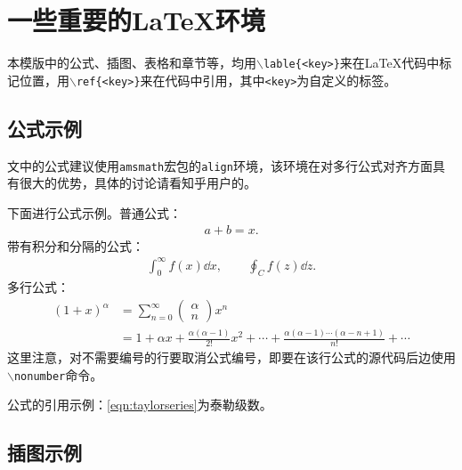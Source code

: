 \chapter{一些重要的\LaTeX{}环境}\label{chap:evm}

本模版中的公式、插图、表格和章节等，均用\texttt{$\backslash$lable\{<key>\}}来在\LaTeX{}代码中标记位置，用\texttt{$\backslash$ref\{<key>\}}来在代码中引用，其中\texttt{<key>}为自定义的标签。

\section{公式示例}

文中的公式建议使用\texttt{amsmath}宏包的\texttt{align}环境，该环境在对多行公式对齐方面具有很大的优势，具体的讨论请看知乎用户\href{https://www.zhihu.com/people/bo-xue-duo-wen-63}{}的\href{https://www.zhihu.com/question/477805692/answer/2045084752}{}。

下面进行公式示例。普通公式：
\begin{align}
    a+b=x.
\end{align}
带有积分和分隔的公式：
\begin{align}
   \int^{\infty}_{0} f(x)\dd{x}, \qquad \oint_{C} f(z)\dd {z}.
\end{align}
多行公式：
\begin{align}
    \left(1+x\right)^{\alpha} &= \sum^{\infty}_{n=0}\left(\begin{matrix} \alpha \\ n\end{matrix}\right)x^n \nonumber \\ 
    &= 1 + \alpha x + \frac{\alpha(\alpha-1)}{2!}x^2 + \cdots + \frac{\alpha(\alpha-1)\cdots(\alpha-n+1)}{n!} + \cdots
    \label{eqn:taylorseries}
\end{align}
这里注意，对不需要编号的行要取消公式编号，即要在该行公式的源代码后边使用\texttt{$\backslash$nonumber}命令。

公式的引用示例：\ref{eqn:taylorseries}为泰勒级数。

\section{插图示例}

